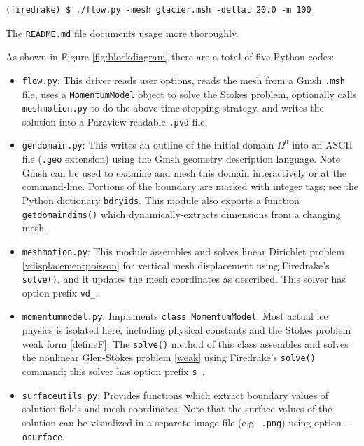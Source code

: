 \documentclass[letterpaper,final,12pt,reqno]{amsart}
\begin{document}
\medskip
\begin{Verbatim}
(firedrake) $ ./flow.py -mesh glacier.msh -deltat 20.0 -m 100
\end{Verbatim}

\medskip
\noindent The \verb|README.md| file documents usage more thoroughly.

\medskip
As shown in Figure \ref{fig:blockdiagram} there are a total of five Python codes:
\begin{itemize}
\item \texttt{flow.py}: \quad  This driver reads user options, reads the mesh from a Gmsh \texttt{.msh} file, uses a \texttt{MomentumModel} object to solve the Stokes problem, optionally calls \texttt{meshmotion.py} to do the above time-stepping strategy, and writes the solution into a Paraview-readable \texttt{.pvd} file.

\item \texttt{gendomain.py}: \quad  This writes an outline of the initial domain $\Omega^0$ into an ASCII file (\texttt{.geo} extension) using the Gmsh \cite{GeuzaineRemacle2009} geometry description language.  Note Gmsh can be used to examine and mesh this domain interactively or at the command-line.  Portions of the boundary are marked with integer tags; see the Python dictionary \texttt{bdryids}.  This module also exports a function \texttt{getdomaindims()} which dynamically-extracts dimensions from a changing mesh.

\item \texttt{meshmotion.py}: \quad  This module assembles and solves linear Dirichlet problem \eqref{vdisplacementpoisson} for vertical mesh displacement using Firedrake's \texttt{solve()}, and it updates the mesh coordinates as described.  This solver has option prefix \texttt{vd\_}.

\item \texttt{momentummodel.py}: \quad  Implements \texttt{class MomentumModel}.  Most actual ice physics is isolated here, including physical constants and the Stokes problem weak form \eqref{defineF}.  The \texttt{solve()} method of this class assembles and solves the nonlinear Glen-Stokes problem \eqref{weak} using Firedrake's \texttt{solve()} command; this solver has option prefix \texttt{s\_}.

\item \texttt{surfaceutils.py}: \quad  Provides functions which extract boundary values of solution fields and mesh coordinates.  Note that the surface values of the solution can be visualized in a separate image file (e.g.~\texttt{.png}) using option \texttt{-osurface}.
\end{itemize}
\end{document}

